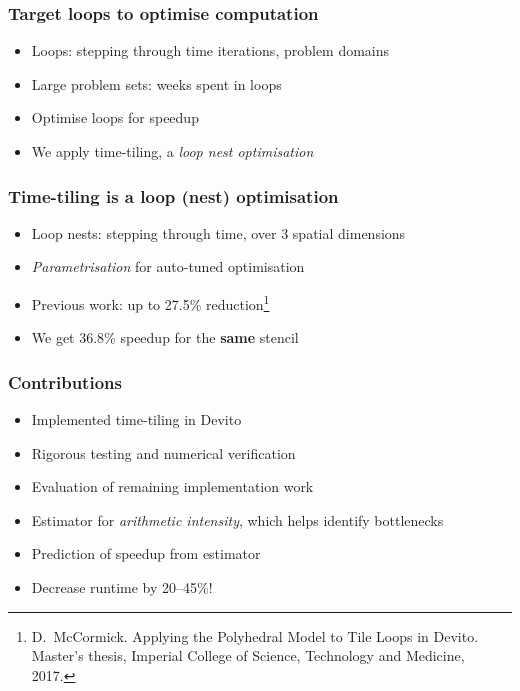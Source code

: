 \documentclass{beamer}
\begin{document}
\begin{frame}
\frametitle{Target loops to optimise computation}

\begin{itemize}
	\item Loops: stepping through time iterations, problem domains
	\item Large problem sets: weeks spent in loops
	\item Optimise loops for speedup
	\item We apply time-tiling, a \emph{loop nest optimisation}
\end{itemize}
\end{frame}



\begin{frame}
\frametitle{Time-tiling is a loop (nest) optimisation}

\begin{itemize}
	\item Loop nests: stepping through time, over 3 spatial dimensions
	\item \emph{Parametrisation} for auto-tuned optimisation
	\item Previous work: up to 27.5\% reduction\footnote{D.~McCormick. Applying the Polyhedral Model to Tile Loops in Devito. Master's thesis, Imperial College of Science, Technology and Medicine, 2017.}
	\item We get 36.8\% speedup for the \textbf{same} stencil
\end{itemize}
\end{frame}



\begin{frame}
\frametitle{Contributions}

\begin{itemize}
	\item Implemented time-tiling in Devito
	\item Rigorous testing and numerical verification
	\item Evaluation of remaining implementation work
	\item Estimator for \emph{arithmetic intensity}, which helps identify bottlenecks
	\item Prediction of speedup from estimator
	\item Decrease runtime by 20--45\%!
\end{itemize}
\end{frame}
\end{document}
